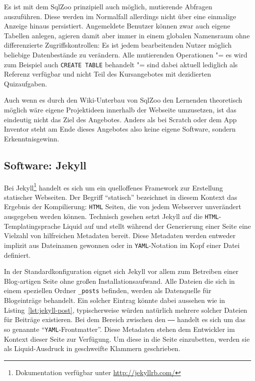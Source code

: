 Es ist mit dem SqlZoo prinzipiell auch möglich, mutierende Abfragen auszuführen. Diese werden im Normalfall allerdings nicht über eine einmalige Anzeige hinaus persistiert. Angemeldete Benutzer können zwar auch eigene Tabellen anlegen, agieren damit aber immer in einem globalen Namensraum ohne differenzierte Zugriffskontrollen: Es ist jedem bearbeitenden Nutzer möglich beliebige Datenbestände zu verändern. Alle mutierenden Operationen "= es wird zum Beispiel auch \texttt{CREATE TABLE} behandelt "= sind dabei aktuell lediglich als Referenz verfügbar und nicht Teil des Kursangebotes mit dezidierten Quizaufgaben.

Auch wenn es durch den Wiki-Unterbau von SqlZoo den Lernenden theoretisch möglich wäre eigene Projektideen innerhalb der Webseite umzusetzen, ist das eindeutig nicht das Ziel des Angebotes. Anders als bei Scratch oder dem App Inventor steht am Ende dieses Angebotes also keine eigene Software, sondern Erkenntnisgewinn.

\subsection{Software: Jekyll}
\label{sec:software-jekyll}
Bei Jekyll\footnote{Dokumentation verfügbar unter \url{http://jekyllrb.com/}} handelt es sich um ein quelloffenes Framework zur Erstellung statischer Webseiten. Der Begriff "`statisch"' bezeichnet in diesem Kontext das Ergebnis der Kompilierung: \texttt{HTML} Seiten, die von jedem Webserver unverändert ausgegeben werden können. Technisch gesehen setzt Jekyll auf die \texttt{HTML}-Templatingsprache Liquid auf und stellt während der Generierung einer Seite eine Vielzahl von hilfreichen Metadaten bereit. Diese Metadaten werden entweder implizit aus Dateinamen gewonnen oder in \texttt{YAML}-Notation im Kopf einer Datei definiert.

In der Standardkonfiguration eignet sich Jekyll vor allem zum Betreiben einer Blog-artigen Seite ohne großen Installationsaufwand. Alle Dateien die sich in einem speziellen Ordner \texttt{\_posts} befinden, werden als Datenquelle für Blogeinträge behandelt. Ein solcher Eintrag könnte dabei aussehen wie in Listing~\ref{lst:jekyll-post}, typischerweise würden natürlich mehrere solcher Dateien für Beiträge existieren. Bei dem Bereich zwischen den \texttt{------} handelt es sich um das so genannte "`\texttt{YAML}-Frontmatter"'. Diese Metadaten stehen dem Entwickler im Kontext dieser Seite zur Verfügung. Um diese in die Seite einzubetten, werden sie als Liquid-Ausdruck in geschweifte Klammern geschrieben.

